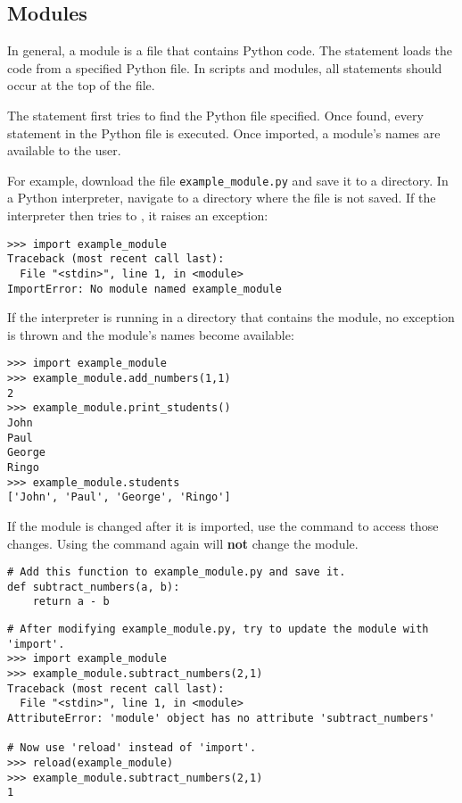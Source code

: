 \subsection*{Modules}

In general, a module is a file that contains Python code.
The  statement loads the code from a specified Python file.
In scripts and modules, all  statements should occur at the top of the file.

The  statement first tries to find the Python file specified.
Once found, every statement in the Python file is executed.
Once imported, a module's names are available to the user.

For example, download the file \texttt{example\_module.py} and save it to a directory.
In a Python interpreter, navigate to a directory where the file is not saved.
If the interpreter then tries to , it raises an exception:

\begin{lstlisting}
>>> import example_module
Traceback (most recent call last):
  File "<stdin>", line 1, in <module>
ImportError: No module named example_module
\end{lstlisting}

If the interpreter is running in a directory that contains the module, no exception is thrown and the module's names become available:

\begin{lstlisting}
>>> import example_module
>>> example_module.add_numbers(1,1)
2
>>> example_module.print_students()
John
Paul
George
Ringo
>>> example_module.students
['John', 'Paul', 'George', 'Ringo']
\end{lstlisting}

If the module is changed after it is imported, use the  command to access those changes.
Using the  command again will \textbf{not} change the module.

\begin{lstlisting}
# Add this function to example_module.py and save it.
def subtract_numbers(a, b):
    return a - b
\end{lstlisting}

\begin{lstlisting}
# After modifying example_module.py, try to update the module with 'import'.
>>> import example_module
>>> example_module.subtract_numbers(2,1)
Traceback (most recent call last):
  File "<stdin>", line 1, in <module>
AttributeError: 'module' object has no attribute 'subtract_numbers'

# Now use 'reload' instead of 'import'.
>>> reload(example_module)
>>> example_module.subtract_numbers(2,1)
1
\end{lstlisting}

